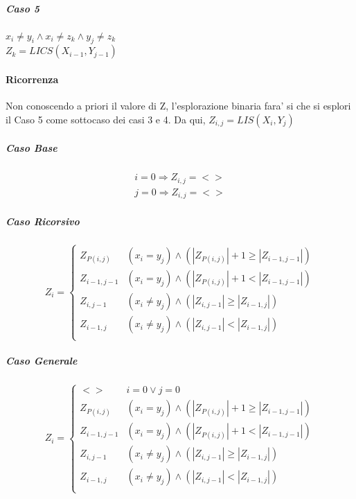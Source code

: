 \subparagraph{Caso 5}

$x_i \ne y_i \land x_i \ne z_k \land y_j \ne z_k$ \\
$Z_k = LICS(X_{i-1}, Y_{j-1})$ \\

\paragraph{Ricorrenza}

Non conoscendo a priori il valore di Z, l'esplorazione binaria fara' si che si esplori il Caso 5 come sottocaso dei casi 3 e 4.
Da qui, $Z_{i,j} = LIS(X_i, Y_j)$

\subparagraph{Caso Base}

\begin{align}
    \text{$i = 0 \Rightarrow Z_{i,j} = <>$} \\
    \text{$j = 0 \Rightarrow Z_{i,j} = <>$}
\end{align}

\subparagraph{Caso Ricorsivo}

\[
    Z_i =
    \begin{cases}
        \text{$Z_{P(i,j)}$} & \text{$(x_i = y_j) \land (|Z_{P(i,j)}| + 1 \geq |Z_{i-1, j-1}|)$} \\
        \text{$Z_{i-1, j-1}$} & \text{$(x_i = y_j) \land (|Z_{P(i,j)}| + 1 < |Z_{i-1, j-1}|)$} \\
        \text{$Z_{i, j-1}$} & \text{$(x_i \ne y_j) \land (|Z_{i, j-1}| \geq |Z_{i-1, j}|)$} \\
        \text{$Z_{i-1, j}$} & \text{$(x_i \ne y_j) \land (|Z_{i, j-1}| < |Z_{i-1, j}|)$} \\
    \end{cases}
\]

\subparagraph{Caso Generale}

\[
    Z_i =
    \begin{cases}
        \text{$<>$} & \text{$i = 0 \lor j = 0$} \\
        \text{$Z_{P(i,j)}$} & \text{$(x_i = y_j) \land (|Z_{P(i,j)}| + 1 \geq |Z_{i-1, j-1}|)$} \\
        \text{$Z_{i-1, j-1}$} & \text{$(x_i = y_j) \land (|Z_{P(i,j)}| + 1 < |Z_{i-1, j-1}|)$} \\
        \text{$Z_{i, j-1}$} & \text{$(x_i \ne y_j) \land (|Z_{i, j-1}| \geq |Z_{i-1, j}|)$} \\
        \text{$Z_{i-1, j}$} & \text{$(x_i \ne y_j) \land (|Z_{i, j-1}| < |Z_{i-1, j}|)$} \\
    \end{cases}
\]


